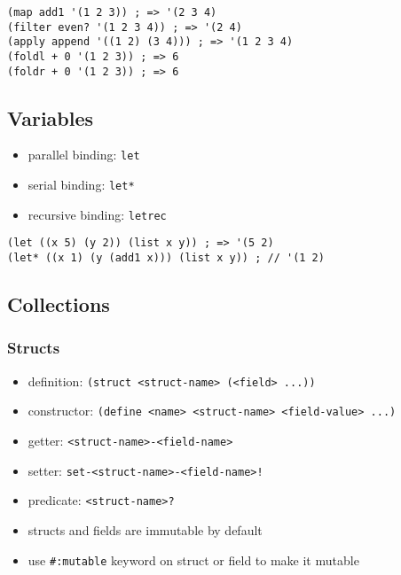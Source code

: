 \documentclass[a4paper,landscape,10pt]{article}
\begin{document}
\begin{multicols*}{2}
  \begin{lstlisting}[language=Racket]
(map add1 '(1 2 3)) ; => '(2 3 4)
(filter even? '(1 2 3 4)) ; => '(2 4)
(apply append '((1 2) (3 4))) ; => '(1 2 3 4)
(foldl + 0 '(1 2 3)) ; => 6
(foldr + 0 '(1 2 3)) ; => 6
\end{lstlisting}


  \subsection{Variables}

  \begin{itemize}
    \item parallel binding: \texttt{let}
    \item serial binding: \texttt{let*}
    \item recursive binding: \texttt{letrec}
  \end{itemize}

  \begin{lstlisting}[language=Racket]
(let ((x 5) (y 2)) (list x y)) ; => '(5 2)
(let* ((x 1) (y (add1 x))) (list x y)) ; // '(1 2)
\end{lstlisting}

  \switchcolumn

  \subsection{Collections}

  \subsubsection{Structs}

  \begin{itemize}
    \item definition: \texttt{(struct <struct-name> (<field> ...))}
    \item constructor: \texttt{(define <name> <struct-name> <field-value> ...)}
    \item getter: \texttt{<struct-name>-<field-name>}
    \item setter: \texttt{set-<struct-name>-<field-name>!}
    \item predicate: \texttt{<struct-name>?}
    \item structs and fields are immutable by default
    \item use \texttt{\#:mutable} keyword on struct or field to make it mutable
  \end{itemize}


\end{multicols*}
\end{document}
